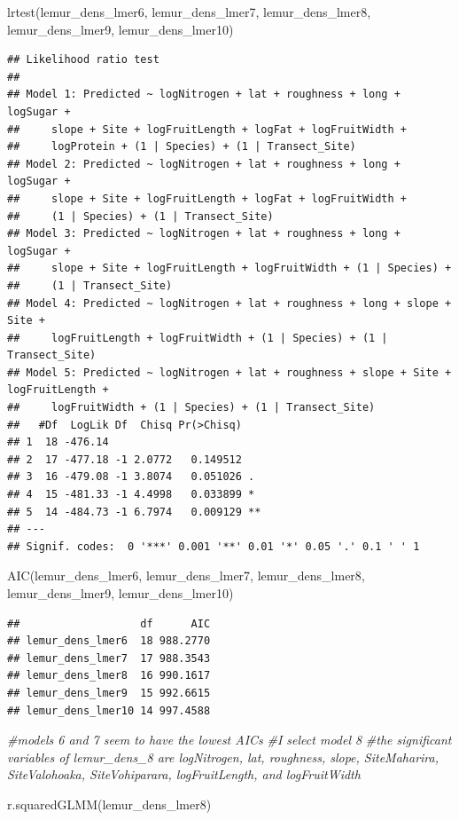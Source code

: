 \documentclass[
  12pt,
]{article}
\newenvironment{Shaded}{\begin{snugshade}}{\end{snugshade}}
\newcommand{\CommentTok}[1]{\textcolor[rgb]{0.56,0.35,0.01}{\textit{#1}}}
\newcommand{\FunctionTok}[1]{\textcolor[rgb]{0.00,0.00,0.00}{#1}}
\newcommand{\NormalTok}[1]{#1}
\begin{document}
\begin{Shaded}
\begin{Highlighting}[]
\FunctionTok{lrtest}\NormalTok{(lemur\_dens\_lmer6, lemur\_dens\_lmer7, lemur\_dens\_lmer8, lemur\_dens\_lmer9, lemur\_dens\_lmer10)}
\end{Highlighting}
\end{Shaded}

\begin{verbatim}
## Likelihood ratio test
## 
## Model 1: Predicted ~ logNitrogen + lat + roughness + long + logSugar + 
##     slope + Site + logFruitLength + logFat + logFruitWidth + 
##     logProtein + (1 | Species) + (1 | Transect_Site)
## Model 2: Predicted ~ logNitrogen + lat + roughness + long + logSugar + 
##     slope + Site + logFruitLength + logFat + logFruitWidth + 
##     (1 | Species) + (1 | Transect_Site)
## Model 3: Predicted ~ logNitrogen + lat + roughness + long + logSugar + 
##     slope + Site + logFruitLength + logFruitWidth + (1 | Species) + 
##     (1 | Transect_Site)
## Model 4: Predicted ~ logNitrogen + lat + roughness + long + slope + Site + 
##     logFruitLength + logFruitWidth + (1 | Species) + (1 | Transect_Site)
## Model 5: Predicted ~ logNitrogen + lat + roughness + slope + Site + logFruitLength + 
##     logFruitWidth + (1 | Species) + (1 | Transect_Site)
##   #Df  LogLik Df  Chisq Pr(>Chisq)   
## 1  18 -476.14                        
## 2  17 -477.18 -1 2.0772   0.149512   
## 3  16 -479.08 -1 3.8074   0.051026 . 
## 4  15 -481.33 -1 4.4998   0.033899 * 
## 5  14 -484.73 -1 6.7974   0.009129 **
## ---
## Signif. codes:  0 '***' 0.001 '**' 0.01 '*' 0.05 '.' 0.1 ' ' 1
\end{verbatim}

\begin{Shaded}
\begin{Highlighting}[]
\FunctionTok{AIC}\NormalTok{(lemur\_dens\_lmer6, lemur\_dens\_lmer7, lemur\_dens\_lmer8, lemur\_dens\_lmer9, lemur\_dens\_lmer10)}
\end{Highlighting}
\end{Shaded}

\begin{verbatim}
##                   df      AIC
## lemur_dens_lmer6  18 988.2770
## lemur_dens_lmer7  17 988.3543
## lemur_dens_lmer8  16 990.1617
## lemur_dens_lmer9  15 992.6615
## lemur_dens_lmer10 14 997.4588
\end{verbatim}

\begin{Shaded}
\begin{Highlighting}[]
\CommentTok{\#models 6 and 7 seem to have the lowest AICs}
\CommentTok{\#I select model 8}
\CommentTok{\#the significant variables of lemur\_dens\_8 are logNitrogen, lat, roughness, slope, SiteMaharira, SiteValohoaka, SiteVohiparara, logFruitLength, and logFruitWidth}

\FunctionTok{r.squaredGLMM}\NormalTok{(lemur\_dens\_lmer8)}
\end{Highlighting}
\end{Shaded}
\end{document}
